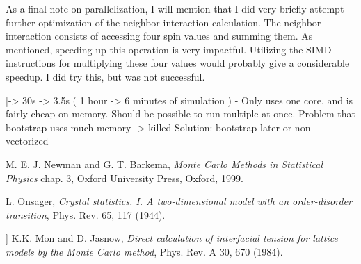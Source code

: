 \documentclass{article}
\begin{document}
As a final note on parallelization, I will mention that I did very briefly attempt further optimization of the neighbor interaction calculation.
The neighbor interaction consists of accessing four spin values and summing them.
As mentioned, speeding up this operation is very impactful.
Utilizing the SIMD instructions for multiplying these four values would probably give a considerable speedup.
I did try this, but was not successful.

  |-> 30s -> 3.5s ( 1 hour -> 6 minutes of simulation )
- Only uses one core, and is fairly cheap on memory.
  Should be possible to run multiple at once.
  Problem that bootstrap uses much memory -> killed
  Solution: bootstrap later or non-vectorized


\begin{thebibliography}{9}
 M. E. J. Newman and G. T. Barkema, \emph{Monte Carlo Methods in Statistical Physics} chap. 3, Oxford University Press, Oxford, 1999.

  L. Onsager, \emph{Crystal statistics. I. A two-dimensional model with an order-disorder transition},  Phys. Rev. 65, 117 (1944).

 ]  K.K. Mon and D. Jasnow, \emph{Direct calculation of interfacial tension for lattice models by the Monte Carlo method}, Phys. Rev. A 30, 670 (1984). 
\end{thebibliography}
\end{document}
